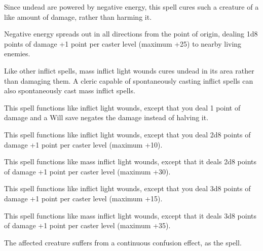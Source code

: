 \begin{multicols}{2}
\begin{small}
\smallskip\noindent Since undead are powered by negative energy, this spell cures such a creature of a like amount of damage, rather than harming it.

\noindent Negative energy spreads out in all directions from the point of origin, dealing 1d8 points of damage +1 point per caster level (maximum +25) to nearby living enemies.

\smallskip\noindent Like other inflict spells, mass inflict light wounds cures undead in its area rather than damaging them. A cleric capable of spontaneously casting inflict spells can also spontaneously cast mass inflict spells.

\noindent This spell functions like inflict light wounds, except that you deal 1 point of damage and a Will save negates the damage instead of halving it.

\noindent This spell functions like inflict light wounds, except that you deal 2d8 points of damage +1 point per caster level (maximum +10).

\noindent This spell functions like mass inflict light wounds, except that it deals 2d8 points of damage +1 point per caster level (maximum +30).

\noindent This spell functions like inflict light wounds, except that you deal 3d8 points of damage +1 point per caster level (maximum +15).

\noindent This spell functions like mass inflict light wounds, except that it deals 3d8 points of damage +1 point per caster level (maximum +35).

\noindent The affected creature suffers from a continuous confusion effect, as the spell.


\end{small}
\end{multicols}
